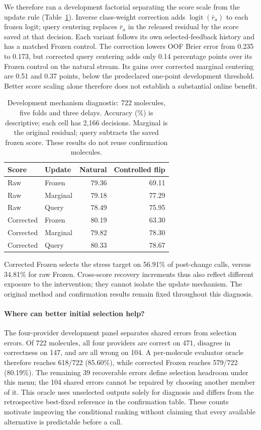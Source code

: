 \documentclass[sigconf,anonymous]{aamas}
\begin{document}
We therefore ran a development factorial separating the score scale from the update rule (Table~\ref{tab:centering-diagnostic}). Inverse class-weight correction adds $\operatorname{logit}(\bar r_a)$ to each frozen logit; query centering replaces $\bar r_a$ in the released residual by the score saved at that decision. Each variant follows its own selected-feedback history and has a matched Frozen control. The correction lowers OOF Brier error from 0.235 to 0.173, but corrected query centering adds only 0.14 percentage points over its Frozen control on the natural stream. Its gains over corrected marginal centering are 0.51 and 0.37 points, below the predeclared one-point development threshold. Better score scaling alone therefore does not establish a substantial online benefit.

\begin{table}[t]
\caption{Development mechanism diagnostic: 722 molecules, five folds and three delays. Accuracy (\%) is descriptive; each cell has 2,166 decisions. Marginal is the original residual; query subtracts the saved frozen score. These results do not reuse confirmation molecules.}
\label{tab:centering-diagnostic}
\centering
\small
\begin{tabular}{@{}llrr@{}}
\toprule
Score & Update & Natural & Controlled flip \\
\midrule
Raw & Frozen & 79.36 & 69.11 \\
Raw & Marginal & 79.18 & 77.29 \\
Raw & Query & 78.49 & 75.95 \\
\midrule
Corrected & Frozen & 80.19 & 63.30 \\
Corrected & Marginal & 79.82 & 78.30 \\
Corrected & Query & 80.33 & 78.67 \\
\bottomrule
\end{tabular}
\end{table}

Corrected Frozen selects the stress target on 56.91\% of post-change calls, versus 34.81\% for raw Frozen. Cross-score recovery increments thus also reflect different exposure to the intervention; they cannot isolate the update mechanism. The original method and confirmation results remain fixed throughout this diagnosis.


\paragraph{Where can better initial selection help?}
The four-provider development panel separates shared errors from selection errors. Of 722 molecules, all four providers are correct on 471, disagree in correctness on 147, and are all wrong on 104. A per-molecule evaluator oracle therefore reaches 618/722 (85.60\%), while corrected Frozen reaches 579/722 (80.19\%). The remaining 39 recoverable errors define selection headroom under this menu; the 104 shared errors cannot be repaired by choosing another member of it. This oracle uses unselected outputs solely for diagnosis and differs from the retrospective best-fixed reference in the confirmation table. These counts motivate improving the conditional ranking without claiming that every available alternative is predictable before a call.
\end{document}
